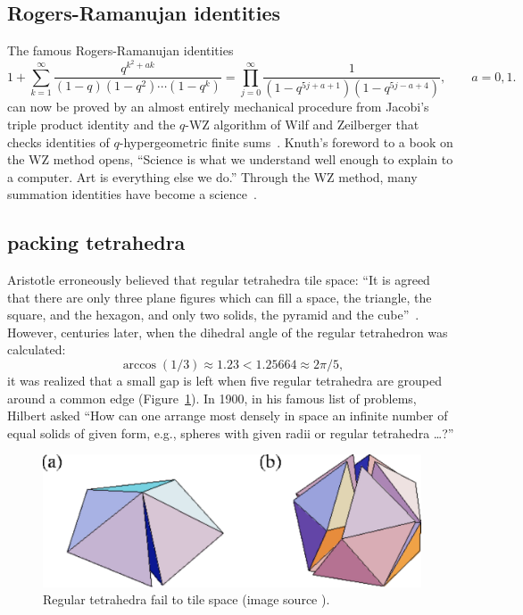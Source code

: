 \documentclass{llncs}
\begin{document}

\subsection{Rogers-Ramanujan identities}

The famous Rogers-Ramanujan identities
\[
1 + \sum_{k=1}^\infty \frac{q^{k^2+a k}}{(1-q)(1-q^2)\cdots (1-q^k)} = 
\prod_{j=0}^\infty \frac{1}{(1-q^{5j+a+1})(1- q^{5j - a +4})},
\qquad a = 0,1.
\]
can now be proved by an almost entirely mechanical procedure from
Jacobi's triple product identity and the $q$-WZ algorithm of Wilf and
Zeilberger that checks identities of $q$-hypergeometric finite
sums~\cite{PP94}.   Knuth's foreword to a book
on the WZ method opens, ``Science is what we understand well enough to
explain to a computer. Art is everything else we do.'' Through the WZ
method, many summation identities have become a science~\cite{PWZ}.


\subsection{packing  tetrahedra}

Aristotle erroneously believed that regular tetrahedra tile space:
``It is agreed that there are only three plane figures which can fill
a space, the triangle, the square, and the hexagon, and only two
solids, the pyramid and the cube''~\cite{Aristotle}.  However,
centuries later, when the dihedral angle of the regular tetrahedron
was calculated:
\[
\arccos(1/3) \approx 1.23 < 1.25664 \approx 2\pi/5,
\]
it was realized that a small gap is left when five regular tetrahedra
are grouped around a common edge (Figure~\ref{fig:gap}).  In 1900, in
his famous list of problems, Hilbert asked ``How can one arrange most
densely in space an infinite number of equal solids of given form,
e.g., spheres with given radii or regular tetrahedra \dots?''

\begin{figure}[h!]
  \centering
\includegraphics[scale=0.3]{tetrahedral_defect.pdf}
  \caption{Regular tetrahedra fail to tile space (image source \cite{tetrahedra}).}
\label{fig:gap}
\end{figure}
\end{document}
